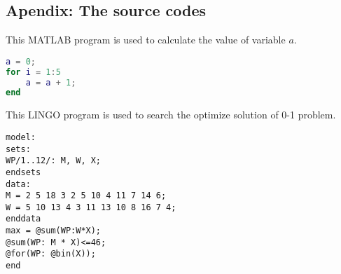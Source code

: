 \documentclass[12pt]{article}
\begin{document}
\clearpage
\begin{subappendices}						%
\section*{Apendix: The source codes}		%

This MATLAB program is used to calculate the value of variable $a$.
\begin{lstlisting}[language=Matlab, caption=\texttt{temp.m}]
a = 0;
for i = 1:5
	a = a + 1;
end
\end{lstlisting}

This LINGO program is used to search the optimize solution of 0-1 problem.
\begin{lstlisting}[language=Lingo, caption=\texttt{temp.lg4}]
model:
sets:
WP/1..12/: M, W, X;
endsets
data:
M = 2 5 18 3 2 5 10 4 11 7 14 6;
W = 5 10 13 4 3 11 13 10 8 16 7 4;
enddata
max = @sum(WP:W*X);
@sum(WP: M * X)<=46;
@for(WP: @bin(X));
end
\end{lstlisting}

\end{subappendices}
\end{document}
